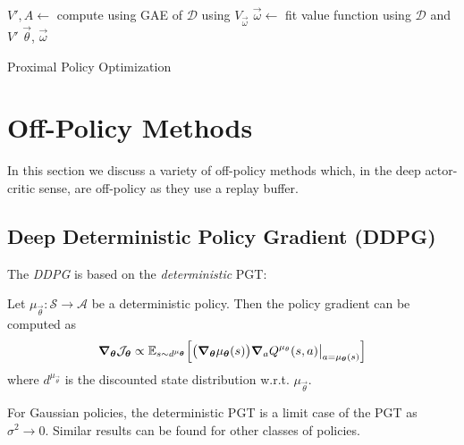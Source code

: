 			\begin{algorithm}  \DontPrintSemicolon
				\( V', A \gets \) compute using \acs{GAE} of \(\mathcal{D}\) using \(V_{\vec{\omega}}\) \;
				\( \vec{\omega} \gets \) fit value function using \(\mathcal{D}\) and \(V'\) \;
				\Return \(\vec{\theta}\), \(\vec{\omega}\) \;
				\caption{Proximal Policy Optimization}
				\label{alg:ppo}
			\end{algorithm}

	\section{Off-Policy Methods}
		In this section we discuss a variety of off-policy methods which, in the deep actor-critic sense, are off-policy as they use a replay buffer.

		\subsection{Deep Deterministic Policy Gradient (\acs{DDPG})}
			The \emph{\ac{DDPG}} is based on the \emph{deterministic} \ac{PGT}:
			\begin{theorem}
				Let \( \mu_{\vec{\theta}} : \mathcal{S} \to \mathcal{A} \) be a deterministic policy. Then the policy gradient can be computed as
				\begin{equation}
					\grad_{\bm{\theta}} \mathcal{J}_{\bm{\theta}} \propto \mathbb{E}_{s \sim d^{\mu_{\bm{\theta}}}}\Bigl[ \bigl( \grad_{\bm{\theta}} \mu_{\bm{\theta}}(s) \bigr) \grad_a Q^{\mu_\theta}(s, a)  \bigr\rvert_{a = \mu_{\bm{\theta}}(s)} \Bigr]
				\end{equation}
				where \(d^{\mu_{\vec{\theta}}}\) is the discounted state distribution w.r.t. \(\mu_{\vec{\theta}}\).
			\end{theorem}
			For Gaussian policies, the deterministic \ac{PGT} is a limit case of the \ac{PGT} as \(\sigma^2 \to 0\). Similar results can be found for other classes of policies.

